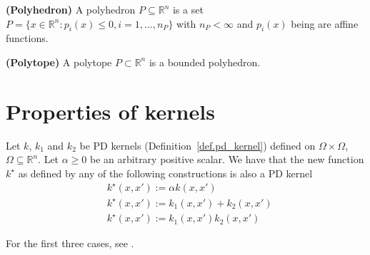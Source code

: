 \begin{definition}
	\textbf{(Polyhedron)}
	A polyhedron $P \subseteq \mathbb{R}^n$ is a set $P = \{x \in \mathbb{R}^n : p_i(x) \leq 0, i=1,\dots,n_P\}$ with $n_P < \infty$ and $p_i(x)$ being are affine functions.
\end{definition}

\begin{definition}
	\textbf{(Polytope)}
	A polytope $P \subset \mathbb{R}^n$ is a bounded polyhedron.
\end{definition}






\chapter{Properties of kernels}

Let $k$, $k_1$ and $k_2$ be PD kernels (Definition~\ref{def.pd_kernel}) defined on $\Omega \times \Omega$, $\Omega \subseteq \mathbb{R}^n$. Let $\alpha \geq 0$ be an arbitrary positive scalar. We have that the new function $k^\star$ as defined by any of the following constructions is also a PD kernel
\begin{align}
	& k^\star(x,x') := \alpha k(x,x') \\
	& k^\star(x,x') := k_1(x,x') + k_2(x,x') \\
	& k^\star(x,x') := k_1(x,x') k_2(x,x') 
\end{align}

\begin{my_proof}
	For the first three cases, see \cite[§4]{steinwart2008svm_book}.
\end{my_proof}

